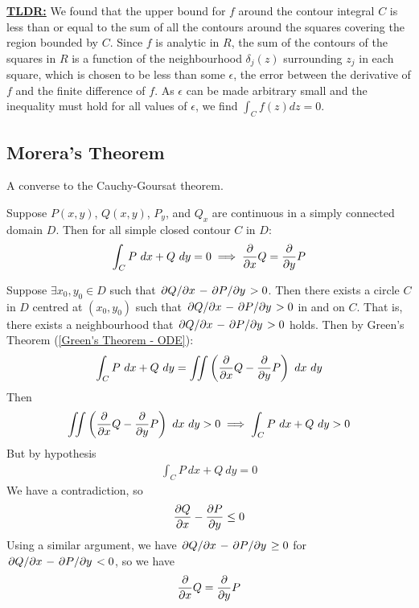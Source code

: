 \documentclass[12pt, english]{book}
\makeatletter
\renewenvironment{proof}[1][\proofname]{\par
	\pushQED{\qed}%
	\normalfont \topsep6\p@\@plus6\p@\relax
	\list{}{%
		\settowidth{\leftmargin}{\itshape\proofname:\hskip\labelsep}%
		\setlength{\labelwidth}{0pt}%
		\setlength{\itemindent}{-\leftmargin}%
	}%
	\item[\hskip\labelsep\itshape#1\@addpunct{:}]\ignorespaces
	}{ \popQED\endlist\@endpefalse}
\makeatother
\begin{document}
\begin{proof}
		\underline{\textbf{TLDR:}} \newline 
		We found that the upper bound for \(f\) around the contour integral \(C\) is less than or equal to the sum of all the contours around the squares covering the region bounded by \(C\). Since \(f\) is analytic in \(R\), the sum of the contours of the squares in \(R\) is a function of the neighbourhood \(\delta_j (z)\) surrounding \(z_j\) in each square, which is chosen to be less than some \(\epsilon\), the error between the derivative of \(f\) and the finite difference of \(f\). 
		As \(\epsilon\) can be made arbitrary small and the inequality must hold for all values of \(\epsilon\), we find \(\int_{C} f(z) dz = 0\).
	\end{proof}

	\subsection{Morera's Theorem} \label{Morera's Theorem Subsection - Complex}
	
	A converse to the Cauchy-Goursat theorem. 
	
	\begin{lemma}
		Suppose \(P(x,y)\), \(Q(x,y)\), \(P_y\), and \(Q_x\) are continuous in a simply connected domain \(D\). Then for all simple closed contour \(C\) in \(D\):
		\begin{align*}
			\int_{C} P \ dx + Q \ dy = 0 \implies \pdv{x}Q = \pdv{y} P 
		\end{align*}
	\end{lemma}
	\begin{proof}
		Suppose \(\exists x_0, y_0 \in D\) such that \(\pdv*{Q}{x} - \pdv*{P}{y} > 0\). Then there exists a circle \(C\) in \(D\) centred at \((x_0, y_0)\) such that \(\pdv*{Q}{x} - \pdv*{P}{y} > 0\) in and on \(C\). That is, there exists a neighbourhood that \(\pdv*{Q}{x} - \pdv*{P}{y} > 0\) holds. Then by Green's Theorem (\cref{Green's Theorem - ODE}):
		\begin{align*}
			\int_{C} P \ dx + Q \ dy = \iint \left(\pdv{x}Q - \pdv{y}P\right) \ dx \ dy
		\end{align*}
		Then 
		\begin{align*}
			\iint \left(\pdv{x}Q - \pdv{y}P\right) \ dx \ dy > 0 
			\implies \int_{C} P \ dx + Q \ dy  > 0
		\end{align*}
		But by hypothesis
		\begin{align*}
			\int_{C} P \ dx + Q \ dy = 0 
		\end{align*}
		We have a contradiction, so 
		\begin{align*}
			\pdv{Q}{x} - \pdv{P}{y} \leq 0
		\end{align*}
		Using a similar argument, we have \(\pdv*{Q}{x} - \pdv*{P}{y} \geq 0\) for \(\pdv*{Q}{x} - \pdv*{P}{y} < 0\), so we have 
		\begin{align*}
			\pdv{x}Q = \pdv{y}P
		\end{align*}
	\end{proof}
\end{document}
